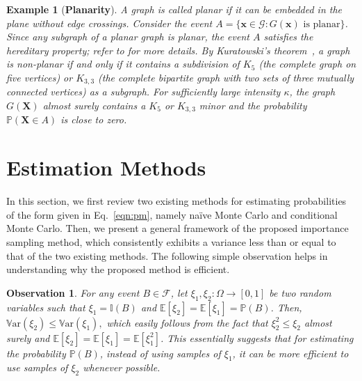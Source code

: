 \documentclass[pdflatex, sn-mathphys-ay]{sn-jnl}%
\newcommand{\ind}{\mathbb{I}}
\newcommand{\mscr}{\mathscr}
\renewcommand{\v}[1]{\boldsymbol{#1}}
\newcommand{\pp}{\mathbb{P}}
\newcommand{\ee}{\mathbb{E}}
\newcommand{\mx}{\v{x}}
\newcommand{\mX}{\v{X}}
\newcommand{\scG}{\mathscr{G}}
\newcommand{\var}{\mathbb{V}\mathrm{ar}}
\newtheorem{observation}{Observation}
\theoremstyle{thmstyleone}%
\theoremstyle{thmstyletwo}%
\newtheorem{example}{Example}%
\theoremstyle{thmstylethree}%
\begin{document}
{ 
\begin{example}[\bf Planarity]
\normalfont
\label{expl:planar}
A graph is called \emph{planar} if it can be embedded in the plane without edge crossings.
Consider the event
$A = \{ \mx \in \scG : G(\mx) \text{ is planar} \}$.
Since any subgraph of a planar graph is planar, the event $A$ satisfies the hereditary property; refer to \cite{diestel2024} for more details. By Kuratowski's theorem~\citep{kuratowski1930probleme}, a graph is non-planar if and only if it contains a subdivision of $K_5$ (the complete graph on five vertices) or $K_{3,3}$ (the complete bipartite graph with two sets of three mutually connected vertices) as a subgraph.
For sufficiently large intensity $\kappa$, the graph $G(\mX)$ almost surely contains a $K_5$ or $K_{3,3}$ minor and the probability $\pp(\mX \in A)$ is close to zero.
\end{example}
}

\section{Estimation Methods}
\label{sec:est_meth}

In this section, we first review two existing methods for estimating  probabilities  of the form given in Eq.~\eqref{eqn:pm}, namely  na\"{i}ve Monte Carlo and  conditional Monte Carlo. 
Then, we present a general framework of the proposed  importance sampling method, which consistently exhibits a variance less than or equal to that of the two existing methods. The following simple observation helps in understanding why the proposed method is efficient. 
\begin{observation}
\label{obs:fund}
For any event $B\in\mscr{F}$, let $\xi_1,\xi_2:\Omega\to[0,1]$ be two random variables such that ${\xi_1 = \ind(B)}$ and $\ee[\xi_2] = \ee[\xi_1] = \pp(B)$. Then, $\var(\xi_2) \leq \var(\xi_1),$
which easily follows from the fact that $\xi_2^2 \leq \xi_2$ almost surely and $\ee[\xi_2] = \ee[\xi_1]=\ee[\xi_1^2]$. 
This essentially suggests that for estimating the  probability $\pp(B)$, instead of using samples of $\xi_1$, it can be more efficient to use samples of $\xi_2$ whenever possible.
\end{observation}
\end{document}
